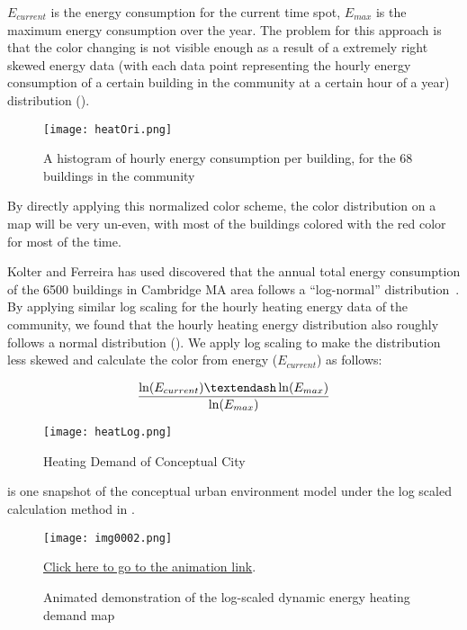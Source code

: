$E_{current}$ is the energy consumption for the current time spot,
$E_{max}$ is the maximum energy consumption over the year. The problem
for this approach is that the color changing is not visible enough as
a result of a extremely right skewed energy data (with each data point
representing the hourly energy consumption of a certain building in
the community at a certain hour of a year) distribution
().

\begin{figure}[h!]
  \centering
  \texttt{[image: heatOri.png]}
  \caption[Heating Demand Histogram of Conceptual City]{A histogram of
    hourly energy consumption per building, for the 68 buildings
    in the community}
  \label{fig:heatOri}
\end{figure}

By directly applying this normalized color scheme, the color
distribution on a map will be very un-even, with most of the buildings
colored with the red color for most of the time. 

Kolter and Ferreira has used discovered that the annual total energy
consumption of the 6500 buildings in Cambridge MA area follows a
``log-normal'' distribution~\cite{Zico2011}. By applying similar log
scaling for the hourly heating energy data of the community, we found
that the hourly heating energy distribution also roughly follows a
normal distribution (). We apply log scaling to make
the distribution less skewed and calculate the color from energy
($E_{current}$) as follows:

\begin{equation}\label{eq:log}
{\ln(E_{current}) – \ln(E_{max}) \over \ln(E_{max})}
\end{equation}

\begin{figure}[h!]
  \centering
  \texttt{[image: heatLog.png]}
  \caption[Heating Demand of Conceptual City]{Heating Demand of
    Conceptual City}
  \label{fig:heatLog}
\end{figure}

 is one snapshot of the conceptual urban environment
model under the log scaled calculation method in .
\begin{figure}[h!]
  \centering
  \texttt{[image: img0002.png]}
  \caption[Animation Demo of the Color Calculation]{Animated
    demonstration of the log-scaled dynamic energy heating demand map}
  \label{fig:img0002}
  \href{http://www.armechxyj.com/energy-mapping.html/#colorAnime}{Click
  here to go to the animation link}.
\end{figure}

